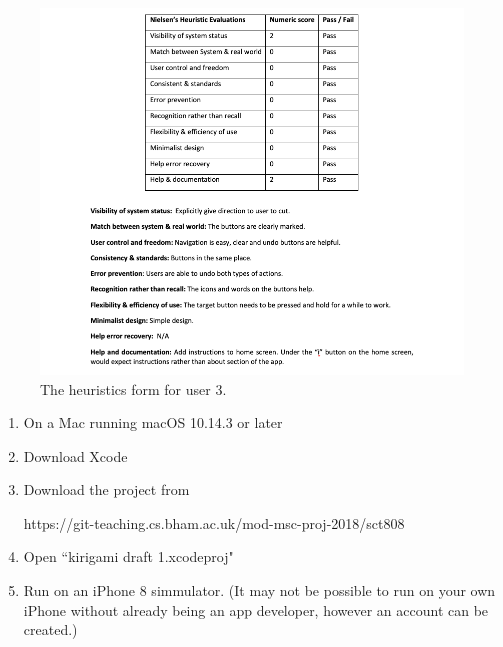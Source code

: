 \documentclass[11pt]{article}
\begin{document}
    \begin{figure}[!ht]
            \centering
            \includegraphics[width=1\linewidth]{Images/User3}
            \caption{The heuristics form for user 3.}
            \label{fig:user3}
    \end{figure}

\clearpage
{}

        \begin{enumerate}
            \item On a Mac running macOS 10.14.3 or later
            \item Download Xcode
            \item Download the project from 
            
            https://git-teaching.cs.bham.ac.uk/mod-msc-proj-2018/sct808
            \item Open ``kirigami draft 1.xcodeproj"
            \item Run on an iPhone 8 simmulator. 
            (It may not be possible to run on your own iPhone without already being an app developer, however an account can be created.)
      
        \end{enumerate}
\end{document}
